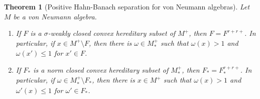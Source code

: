 \documentclass[a4paper]{amsart}
\theoremstyle{plain}
\newtheorem{thm}{Theorem}[section]
\theoremstyle{definition}
\begin{document}
\begin{thm}[Positive Hahn-Banach separation for von Neumann algebras]\label{positive hahn-banach w*}
Let $M$ be a von Neumann algebra.
\begin{enumerate}
\item If $F$ is a $\sigma$-weakly closed convex hereditary subset of $M^+$, then $F=F^{r+r+}$. In particular, if $x\in M^+\setminus F$, then there is $\omega\in M_*^+$ such that $\omega(x)>1$ and $\omega(x')\le1$ for $x'\in F$.
\item If $F_*$ is a norm closed convex hereditary subset of $M_*^+$, then $F_*=F_*^{r+r+}$. In particular, if $\omega\in M_*^+\setminus F_*$, then there is $x\in M^+$ such that $\omega(x)>1$ and $\omega'(x)\le1$ for $\omega'\in F_*$.
\end{enumerate}
\end{thm}
\end{document}
